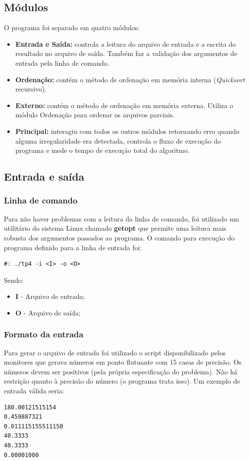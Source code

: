 \documentclass[12pt]{article}
\begin{document}
\subsection{Módulos}
O programa foi separado em quatro módulos:
\begin{itemize}
\item \textbf{Entrada e Saída:} controla a leitura do arquivo de entrada
e a escrita do resultado no arquivo de saída. Também faz a validação dos 
argumentos de entrada pela linha de comando.
\item \textbf{Ordenação:} contém o método de ordenação em memória interna 
(\textit{Quicksort} recursivo).
\item \textbf{Externo:} contém o método de ordenação em memória externa. Utiliza
o módulo Ordenação para ordenar os arquivos parciais.
\item \textbf{Principal:} interagiu com todos os outros módulos retornando erro
quando alguma irregularidade era detectada, controla o fluxo de execução do
programa e mede o tempo de execução total do algoritmo.
\end{itemize}

\subsection{Entrada e saída}
\subsubsection{Linha de comando}
Para não haver problemas com a leitura da linha de comando, foi utilizado um utilitário do
sistema Linux chamado \textbf{getopt} que permite uma leitura mais robusta dos argumentos
passados ao programa. O comando para execução do programa definido para a linha de entrada 
foi:
\begin{verbatim}
#: ./tp4 -i <I> -o <O>
\end{verbatim}
Sendo: 
\begin{itemize}
  \item \textbf{I} - Arquivo de entrada;
  \item \textbf{O} - Arquivo de saída;
\end{itemize}

\subsubsection{Formato da entrada}
Para gerar o arquivo de entrada foi utilizado o script disponibilizado pelos monitores que 
gerava números em ponto flutuante com 15 casas de precisão. Os números devem ser positivos 
(pela própria especificação do problema). Não há restrição quanto à  precisão do número (o 
programa trata isso). Um exemplo de entrada válida seria:
\begin{verbatim}
180.00121515154
0.459887321
0.011115155511150
40.3333
40.3333
0.00001000
\end{verbatim}
\end{document}
